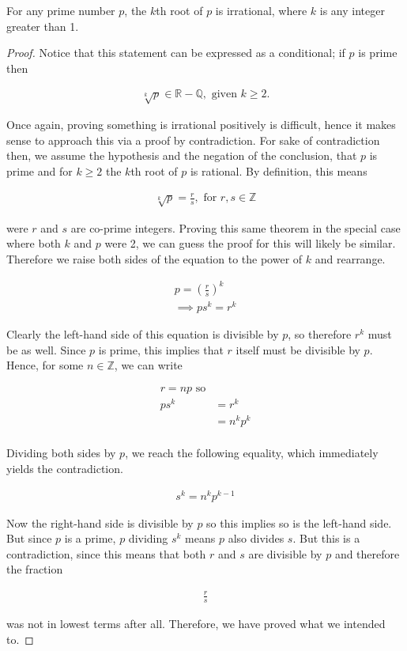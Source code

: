 \vspace{\baselineskip}
\begin{theorem}
	For any prime number $p$, the $k$th root of $p$ is irrational, where $k$ is any integer greater than 1.
\end{theorem}
\begin{proof}
	Notice that this statement can be expressed as a conditional; if $p$ is prime then 
	
	\begin{align*}
		\sqrt[k]{p} \in \mathbb{R} - \mathbb{Q}, \text{ given } k \ge 2.
	\end{align*}
	
	Once again, proving something is irrational positively is difficult, hence it makes sense to approach this via a proof by contradiction. For sake of contradiction then, we assume the hypothesis and the negation of the conclusion, that $p$ is prime and for $k \ge 2$ the $k$th root of $p$ is rational. By definition, this means

	\begin{align*}
		\sqrt[k]{p} = \frac{r}{s}, \text{ for } r, s \in \mathbb{Z}
	\end{align*}
	
	were $r$ and $s$ are co-prime integers. Proving this same theorem in the special case where both $k$ and $p$ were 2, we can guess the proof for this will likely be similar. Therefore we raise both sides of the equation to the power of $k$ and rearrange.
	
	\begin{align*}
		p = \left( \frac{r}{s} \right)^k \\
		\implies p s^k = r^k
	\end{align*}
	
	Clearly the left-hand side of this equation is divisible by $p$,  so therefore $r^k$ must be as well. Since $p$ is prime, this implies that $r$ itself must be divisible by $p$. Hence, for some $n \in \mathbb{Z}$, we can write
	
	\begin{align*}
		r = np \text{ so} \\
		p s^k &= r^k \\
		&= n^k p^k \\
	\end{align*}
	
	Dividing both sides by $p$, we reach the following equality, which immediately yields the contradiction.
	
	\begin{align*}
		s^k = n^k p^{k - 1}
	\end{align*}
	
	Now the right-hand side is divisible by $p$ so this implies so is the left-hand side. But since $p$ is a prime, $p$ dividing $s^k$ means $p$ also divides $s$. But this is a contradiction, since this means that both $r$ and $s$ are divisible by $p$ and therefore the fraction
	
	\begin{align*}
		\frac{r}{s}
	\end{align*}
	
	was not in lowest terms after all. Therefore, we have proved what we intended to.
\end{proof}
